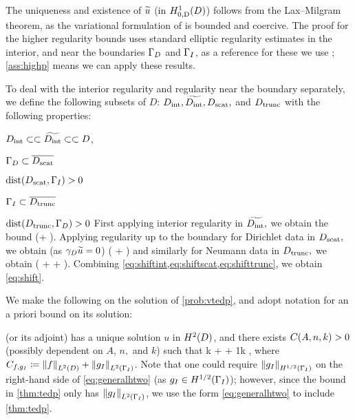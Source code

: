 The uniqueness and existence of $\widetilde{u}$ (in $\HozDD$) follows from the Lax--Milgram theorem, as the variational formulation of is bounded and coercive. The proof for the higher regularity bounds uses standard elliptic regularity estimates in the interior, and near the boundaries $\Gamma_{D}$ and $\Gamma_{I}$, as a reference for these we use \cite[pp. 137-138]{Mc:00}; \cref{ass:highp} means we can apply these results.

To deal with the interior regularity and regularity near the boundary separately, we define the following subsets of $D$: $D_{\mathrm{int}},\widetilde{D_{\mathrm{int}}},D_{\mathrm{scat}},$ and $D_{\mathrm{trunc}}$ with the following properties:
\bit
\item $D_{\mathrm{int}} \subset\subset \widetilde{D_{\mathrm{int}}} \subset\subset D$,
\item $\Gamma_{D} \subset \overline{D_{\mathrm{scat}}}$
\item $\operatorname{dist}(D_{\mathrm{scat}},\Gamma_{I}) > 0 $
  \item $\Gamma_{I} \subset \overline{D_{\mathrm{trunc}}}$
\item $\operatorname{dist}(D_{\mathrm{trunc}},\Gamma_{D}) > 0 $
    \eit
    First applying interior regularity \cite[Theorem 4.16]{Mc:00} in $\widetilde{D_{\mathrm{int}}},$ we obtain the bound
    \beq\label{eq:shiftint}
\NHlptDint{\utilde} \leq \CintAl \mleft(\NHoDinttilde + \NHlDinttilde{\ftilde}\mright).
\eeq
Applying regularity up to the boundary for Dirichlet data \cite[Theorem 4.18 (i)]{Mc:00} in $D_{\mathrm{scat}},$ we obtain (as $\gamma_{D} \widetilde{u} = 0$)
\beq\label{eq:shiftscat}
\NHlptDscat{\utilde} \leq \CscatAl \mleft(\NHoD{\utilde} + \NHlD{\ftilde}\mright)
\eeq
and similarly for Neumann data \cite[Theorem 4.18 (ii)]{Mc:00} in $D_{\mathrm{trunc}},$ we obtain
\beq\label{eq:shifttrunc}
\NHlptDtrunc{\utilde} \leq \CtruncAl \mleft(\NHoD{\utilde} + \NHlphGI{\dn \utilde} + \NHlD{\ftilde}\mright).
\eeq
Combining \cref{eq:shiftint,eq:shiftscat,eq:shifttrunc}, we obtain \cref{eq:shift}.
\epf

We make the following  on the solution of \cref{prob:vtedp}, and adopt notation for an a priori bound on its solution:

\bas\label{ass:htwo}
 (or its adjoint) has a unique solution $u$ in $\HtD$, and there exists $\CAnk>0$ (possibly dependent on $A$, $n,$ and $k$) such that
\beq\label{eq:generalhtwo}
k  +  + \frac1k  \leq \CAnk \Cfg,
\eeq
where $\Cfg \de \NLtD{f} + \NLtGI{\gI}$.
\eas
Note that one could require $\NHhGI{\gI}$ on the right-hand side of \cref{eq:generalhtwo} (as $\gI \in \HhGI$); however, since the bound in \cref{thm:tedp} only has $\NLtGI{\gI}$, we use the form \cref{eq:generalhtwo} to include \cref{thm:tedp}.

